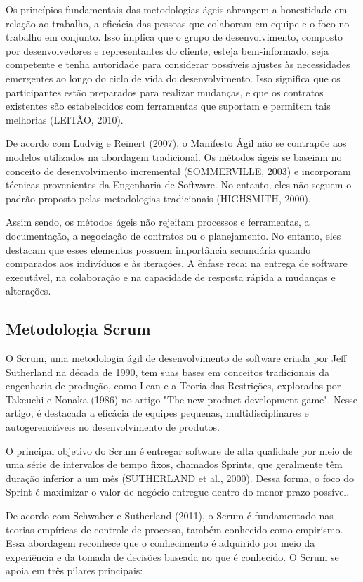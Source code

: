 Os princípios fundamentais das metodologias ágeis abrangem a honestidade em relação ao trabalho, a eficácia das pessoas que colaboram em equipe e o foco no trabalho em conjunto. Isso implica que o grupo de desenvolvimento, composto por desenvolvedores e representantes do cliente, esteja bem-informado, seja competente e tenha autoridade para considerar possíveis ajustes às necessidades emergentes ao longo do ciclo de vida do desenvolvimento. Isso significa que os participantes estão preparados para realizar mudanças, e que os contratos existentes são estabelecidos com ferramentas que suportam e permitem tais melhorias (LEITÃO, 2010).

De acordo com Ludvig e Reinert (2007), o Manifesto Ágil não se contrapõe aos modelos utilizados na abordagem tradicional. Os métodos ágeis se baseiam no conceito de desenvolvimento incremental (SOMMERVILLE, 2003) e incorporam técnicas provenientes da Engenharia de Software. No entanto, eles não seguem o padrão proposto pelas metodologias tradicionais (HIGHSMITH, 2000).

Assim sendo, os métodos ágeis não rejeitam processos e ferramentas, a documentação, a negociação de contratos ou o planejamento. No entanto, eles destacam que esses elementos possuem importância secundária quando comparados aos indivíduos e às iterações. A ênfase recai na entrega de software executável, na colaboração e na capacidade de resposta rápida a mudanças e alterações.

\subsection{Metodologia Scrum}
O Scrum, uma metodologia ágil de desenvolvimento de software criada por Jeff Sutherland na década de 1990, tem suas bases em conceitos tradicionais da engenharia de produção, como Lean e a Teoria das Restrições, explorados por Takeuchi e Nonaka (1986) no artigo "The new product development game". Nesse artigo, é destacada a eficácia de equipes pequenas, multidisciplinares e autogerenciáveis no desenvolvimento de produtos.

O principal objetivo do Scrum é entregar software de alta qualidade por meio de uma série de intervalos de tempo fixos, chamados Sprints, que geralmente têm duração inferior a um mês (SUTHERLAND et al., 2000). Dessa forma, o foco do Sprint é maximizar o valor de negócio entregue dentro do menor prazo possível.

De acordo com Schwaber e Sutherland (2011), o Scrum é fundamentado nas teorias empíricas de controle de processo, também conhecido como empirismo. Essa abordagem reconhece que o conhecimento é adquirido por meio da experiência e da tomada de decisões baseada no que é conhecido. O Scrum se apoia em três pilares principais:

